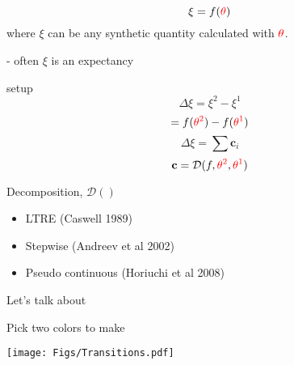 \documentclass[20pt,usenames,dvipsnames]{beamer}
\begin{document}

\begin{frame}[plain]
\Large
$$\xi = f(\color{red}\theta \color{black})$$
\pause
where $\xi$ can be any synthetic quantity calculated with $\color{red}\theta$.

- often $\xi$ is an expectancy
\end{frame}


\begin{frame}[plain]{setup}
\Large
$$ \Delta \xi = \xi^2 - \xi^1$$
\pause
$$ = f(\color{red}{\theta^2} \color{black}) - f(\color{red}{\theta^1} \color{black})$$
\pause
$$ \Delta\xi = \sum \mathbf{c}_i$$
\pause
$$ \mathbf{c} = \mathcal{D}(f, \color{red}{\theta^2}\color{black},\color{red}{\theta^1}\color{black})$$
\end{frame}


\begin{frame}[plain]{Decomposition, $\mathcal{D}()$}
\begin{itemize}
\item LTRE (Caswell 1989)
\item Stepwise (Andreev et al 2002)
\item Pseudo continuous (Horiuchi et al 2008)
\end{itemize}

\end{frame}


\begin{frame}[plain]

\Huge
\centering
Let's talk about \scalebox{2}{\color{red}$\theta$}

\end{frame}


\begin{frame}[plain]

\Large
Pick two colors to make \scalebox{1.5}{\color{red}$\theta$}

\begin{center}
\texttt{[image: Figs/Transitions.pdf]}
\end{center}
\end{frame}

\end{document}

